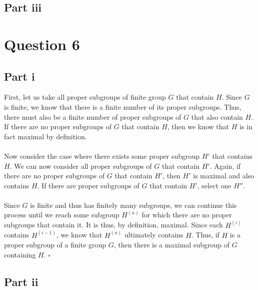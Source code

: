 \documentclass[letterpaper]{article}
\newcommand*{\QED}{\hfill\ensuremath{\square}}%
\begin{document}
\subsection{Part iii}
\label{sub:5Partiii}

\section{Question 6}
\label{sec:Question6}

\subsection{Part i}
\label{sub:6Parti}

First, let us take all proper subgroups of finite group $ G $ that contain $ H $.
Since $ G $ is finite, we know that there is a finite number of its proper subgroups.
Thus, there must also be a finite number of proper subgroups of $ G $ that also contain $ H $.
If there are no proper subgroups of $ G $ that contain $ H $, then we know that $ H $ is in fact maximal by definition.
\\ \\
Now consider the case where there exists some proper subgroup $ H' $ that contains $ H $.
We can now consider all proper subgroups of $ G $ that contain $ H' $.
Again, if there are no proper subgroups of $ G $ that contain $ H' $, then $ H' $ is maximal and also contains $ H $.
If there are proper subgroups of $ G $ that contain $ H' $, select one $ H'' $.
\\ \\
Since $ G $ is finite and thus has finitely many subgroups, we can continue this process until we reach some subgroup $ H^{(n)} $ for which there are no proper subgroups that contain it.
It is thus, by definition, maximal.
Since each $ H^{(i)} $ contains $ H^{(i - 1)} $, we know that $ H^{(n)} $ ultimately contains $ H $.
Thus, if $ H $ is a proper subgroup of a finite group $ G $, then there is a maximal subgroup of $ G $ containing $ H $.
\QED{}

\subsection{Part ii}
\label{sub:6Partii}
\end{document}
